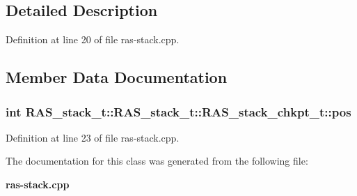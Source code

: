 \subsection{Detailed Description}


Definition at line 20 of file ras-stack.cpp.

\subsection{Member Data Documentation}
\subsubsection[{pos}]{\setlength{\rightskip}{0pt plus 5cm}int RAS\_\-stack\_\-t::RAS\_\-stack\_\-t::RAS\_\-stack\_\-chkpt\_\-t::pos}\label{classRAS__stack__t_1_1RAS__stack__chkpt__t_7281fcb88520e943302cd6b777477fb2}




Definition at line 23 of file ras-stack.cpp.

The documentation for this class was generated from the following file:\begin{CompactItemize}
\item 
{\bf ras-stack.cpp}\end{CompactItemize}
